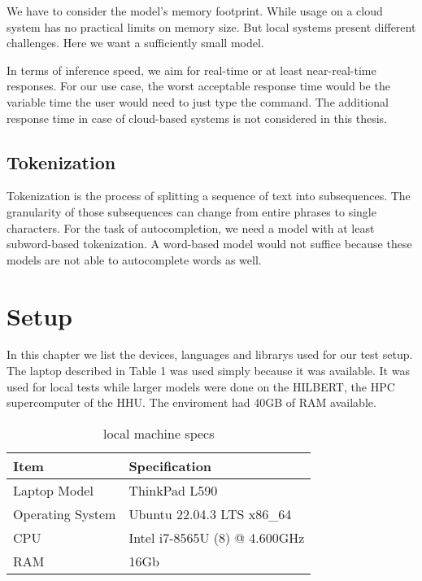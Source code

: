 We have to consider the model's memory footprint. While usage on a cloud system has no practical limits on memory size. But local systems present different challenges.
Here we want a sufficiently small model.

In terms of inference speed, we aim for real-time or at least near-real-time responses. For our use case, the worst acceptable response time would be the variable time the user would need to just type the command. The additional response time in case of cloud-based systems is not considered in this thesis.


\subsection{Tokenization}

Tokenization is the process of splitting a sequence of text into subsequences. The granularity of those subsequences can change from entire phrases to single characters.
For the task of autocompletion, we need a model with at least subword-based tokenization. A word-based model would not suffice because these models are not able to autocomplete words as well. 






\section{Setup}\raggedbottom
In this chapter we list the devices, languages and librarys used for our test setup.
The laptop described in Table 1 was used simply because it was available. It was used for local tests while larger models were done on the HILBERT, the HPC supercomputer of the HHU. The enviroment had 40GB of RAM available.


\begin{table}[h]
\centering
\begin{tabular}{|l|l|}
\hline
\textbf{Item} & \textbf{Specification} \\
\hline
Laptop Model & ThinkPad L590 \\
\hline
Operating System & Ubuntu 22.04.3 LTS x86\_64 \\
\hline
CPU & Intel i7-8565U (8) @ 4.600GHz \\
\hline
RAM & 16Gb \\
\hline
\end{tabular}
\caption{local machine specs }
\end{table}



